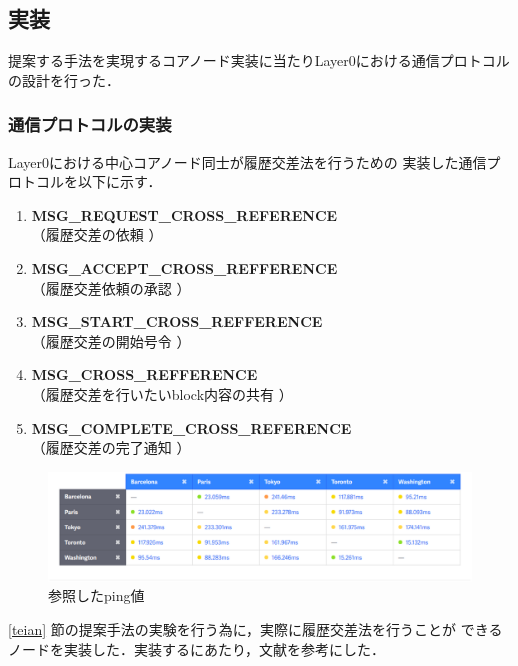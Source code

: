 \documentclass[a4paper,12pt]{jsarticle}
\begin{document}
\subsection{実装}
提案する手法を実現するコアノード実装に当たりLayer0における通信プロトコルの設計を行った．
\subsubsection{通信プロトコルの実装}
\label{syuhou}
Layer0における中心コアノード同士が履歴交差法を行うための
実装した通信プロトコルを以下に示す．

\hspace{5mm}
%
\begin{enumerate}
\item \textbf{MSG\_REQUEST\_CROSS\_REFERENCE}\\
\hspace{12mm} （履歴交差の依頼 ）
\item \textbf{MSG\_ACCEPT\_CROSS\_REFFERENCE}\\
\hspace{12mm}  （履歴交差依頼の承認 ）
  \item \textbf{MSG\_START\_CROSS\_REFFERENCE}\\
\hspace{12mm}  （履歴交差の開始号令 ）
  \item \textbf{MSG\_CROSS\_REFFERENCE}\\
\hspace{12mm}  （履歴交差を行いたいblock内容の共有 ）
  \item \textbf{MSG\_COMPLETE\_CROSS\_REFERENCE}\\
\hspace{12mm}  （履歴交差の完了通知 ）
\end{enumerate}
%
\hspace{5mm}
%
\begin{figure}[H]%
  \begin{center}
    \includegraphics[width=160mm]{pht/Screenshot.eps}
  \end{center}
	\caption{参照したping値\cite{pings}}
  \label{fig:pings}
\end{figure}
%
\ref{teian} 節の提案手法の実験を行う為に，実際に履歴交差法を行うことが
できるノードを実装した．実装するにあたり，文献\cite{hamatsu2018}を参考にした．
\end{document}
